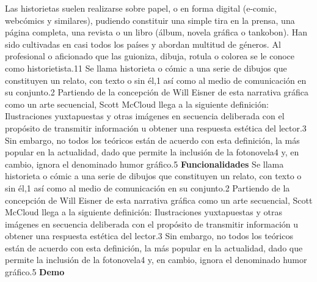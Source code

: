 \documentclass[12pt]{report}
\begin{document}
Las historietas suelen realizarse sobre papel, o en forma digital (e-comic, webcómics y similares), pudiendo constituir una simple tira en la prensa, una página completa, una revista o un libro (álbum, novela gráfica o tankobon). Han sido cultivadas en casi todos los países y abordan multitud de géneros. Al profesional o aficionado que las guioniza, dibuja, rotula o colorea se le conoce como historietista.11
Se llama historieta o cómic a una serie de dibujos que constituyen un relato, con texto o sin él,1 así como al medio de comunicación en su conjunto.2 Partiendo de la concepción de Will Eisner de esta narrativa gráfica como un arte secuencial, Scott McCloud llega a la siguiente definición: Ilustraciones yuxtapuestas y otras imágenes en secuencia deliberada con el propósito de transmitir información u obtener una respuesta estética del lector.3 Sin embargo, no todos los teóricos están de acuerdo con esta definición, la más popular en la actualidad, dado que permite la inclusión de la fotonovela4 y, en cambio, ignora el denominado humor gráfico.5
	\newline
	\newline
	\newline
	\newline
	\begingroup
		\large{
			\textbf{
				Funcionalidades
				\newline
				\newline
			}
		}
	\endgroup
Se llama historieta o cómic a una serie de dibujos que constituyen un relato, con texto o sin él,1 así como al medio de comunicación en su conjunto.2 Partiendo de la concepción de Will Eisner de esta narrativa gráfica como un arte secuencial, Scott McCloud llega a la siguiente definición: Ilustraciones yuxtapuestas y otras imágenes en secuencia deliberada con el propósito de transmitir información u obtener una respuesta estética del lector.3 Sin embargo, no todos los teóricos están de acuerdo con esta definición, la más popular en la actualidad, dado que permite la inclusión de la fotonovela4 y, en cambio, ignora el denominado humor gráfico.5
	\newline
	\newline
	\newline
	\newline
	\begingroup
		\large{
			\textbf{
				Demo	
				\newline
				\newline
			}
		}
	\endgroup
\end{document}
